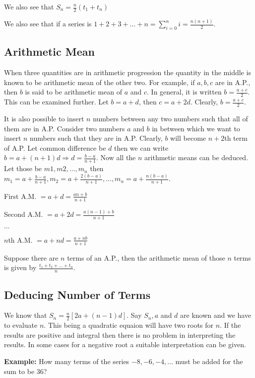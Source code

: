 We also see that $S_n = \frac{n}{2}(t_1 + t_n)$

We also see that if a series is $1 + 2 + 3 + \ldots + n = \sum_{i=0}^ni = \frac{n(n + 1)}{2}$.

\subsection{Arithmetic Mean}
When three quantities are in arithmetic progression the quantity in the middle is known to be arithmetic mean of the other two. For
example, if $a, b, c$ are in A.P., then $b$ is said to be arithmetic mean of $a$ and $c$. In general, it is written $b = \frac{a +
  c}{2}$. This can be examined further. Let $b = a + d$, then $c = a + 2d$. Clearly, $b = \frac{a + c}{2}$.

It is also possible to insert $n$ numbers between any two numbers such that all of them are in A.P. Consider two numbers $a$ and
$b$ in between which we want to insert $n$ numbers such that they are in A.P. Clearly, $b$ will become $n +2$th term of A.P. Let
common difference be $d$ then we can write $b = a + (n + 1)d \Rightarrow d = \frac{b - a}{n + 1}$. Now all the $n$ arithmetic means
can be deduced. Let those be $m1, m2, \ldots, m_n$ then $m_1 = a + \frac{b - a}{n + 1}, m_2 = a + \frac{2(b - a)}{n + 1}, \ldots,
m_n = a + \frac{n(b - a)}{n + 1}$.

First A.M. $= a + d = \frac{an + b}{n +1}$

Second A.M. $= a + 2d = \frac{a(n - 1) + b}{n + 1}$

$\ldots$

$n$th A.M. $= a + nd = \frac{a + nb}{n + 1}$

Suppose there are $n$ terms of an A.P., then the arithmetic mean of those $n$ terms is given by $\frac{t_1 + t_2 + \ldots +
  t_n}{n}$.

\subsection{Deducing Number of Terms}
We know that $S_n = \frac{n}{2}[2a + (n - 1)d]$. Say $S_n, a$ and $d$ are known and we have to evaluate $n$. This being a quadratic
equaion will have two roots for $n$. If the results are positive and integral then there is no problem in interpreting the
results. In some cases for a negative root a suitable interpretation can be given.

\textbf{Example:} How many terms of the series $-8, -6, -4, \ldots$ must be added for the sum to be $36$?

